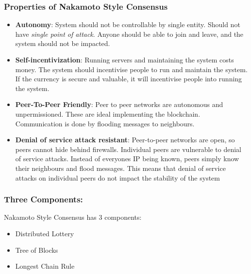     \begin{frame}
        \frametitle{Properties of Nakamoto Style Consensus}
            \begin{itemize}
                \item \textbf{Autonomy}: System should not be controllable by single entity. Should not have \textit{single point of attack}. Anyone should be able to join and leave, and the system should not be impacted.
                \item \textbf{Self-incentivization}: Running servers and maintaining the system costs money. The system should incentivise people to run and maintain 
                the system. If the currency is secure and valuable, it will incentivise people into running the system.
                \item \textbf{Peer-To-Peer Friendly}: Peer to peer networks are autonomous and unpermissioned. These are ideal implementing the blockchain. Communication is done by flooding messages to neighbours. 
                \item \textbf{Denial of service attack resistant}: Peer-to-peer networks are open, so peers cannot hide behind firewalls. Individual peers are vulnerable to denial of service attacks. Instead of everyones IP being known, peers simply know their neighbours and flood messages. This means that denial of service attacks on individual peers do not impact the stability of the system
            \end{itemize}
    \end{frame}
        \begin{frame}
            \frametitle{Three Components:}
                Nakamoto Style Consensus has 3 components: 
                \begin{itemize}
                    \item Distributed Lottery
                    \item Tree of Blocks
                    \item Longest Chain Rule
                \end{itemize}
        \end{frame}

